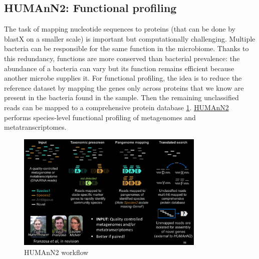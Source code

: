 \subsection{HUMAnN2: Functional profiling}

The task of mapping nucleotide sequences to proteins (that can be done by blastX on a smaller scale) is important but computationally challenging. 
Multiple bacteria can be responsible for the same function in the microbiome. Thanks to this redundancy, functions are more conserved than bacterial prevalence: the abundance of a bacteria can vary but its function remains efficient because another microbe supplies it.
For functional profiling, the idea is to reduce the reference dataset by mapping the genes only across proteins that we know are present in the bacteria found in the sample. Then the remaining unclassified reads can be mapped to a comprehensive protein database \ref{fig:human2}.
\href{https://www.nature.com/articles/s41592-018-0176-y}{HUMAnN2} performs species-level functional profiling of metagenomes and metatranscriptomes.

\begin{figure}[!h]
\centering
\includegraphics[width=0.8\textwidth]{human2.png}
\caption{\label{fig:human2}HUMAnN2 workflow}
\end{figure}
